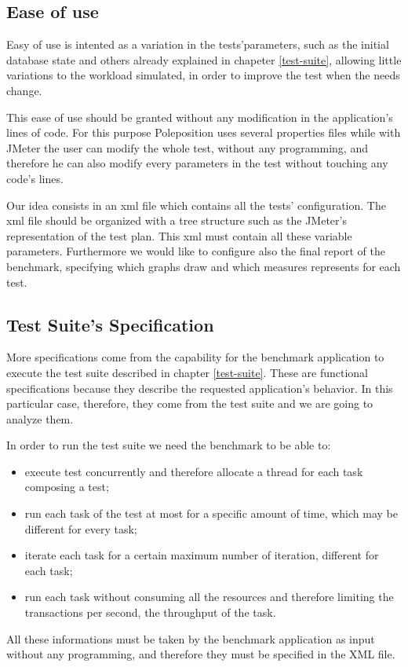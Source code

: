 		\subsection{Ease of use}
Easy of use is intented as a variation in the tests'parameters, such as the initial database state and others already explained in chapeter \ref{test-suite}, allowing little variations to the workload simulated, in order to improve the test when the needs change. 

This ease of use should be granted without any modification in the application's lines of code. For this purpose Poleposition uses several properties files while with JMeter the user can modify the whole test, without any programming, and therefore he can also modify every parameters in the test without touching any code's lines.

Our idea consists in an xml file which contains all the tests' configuration. The xml file should be organized with a tree structure such as the JMeter's representation of the test plan. This xml must contain all these variable parameters. Furthermore we would like to configure also the final report of the benchmark, specifying which graphs draw and which measures represents for each test.

		\subsection{Test Suite's Specification} \label{test-suite-specification}
More specifications come from the capability for the benchmark application to execute the test suite described in chapter \ref{test-suite}. These are functional specifications because they describe the requested application's behavior. In this particular case, therefore, they come from the test suite and we are going to analyze them. 

In order to run the test suite we need the benchmark to be able to:
\begin{itemize}
	\item execute test concurrently and therefore allocate a thread for each task composing a test; 
	\item run each task of the test at most for a specific amount of time, which may be different for every task;
	\item iterate each task for a certain maximum number of iteration, different for each task;
	\item run each task without consuming all the resources and therefore limiting the transactions per second, the throughput of the task.
\end{itemize}
All these informations must be taken by the benchmark application as input without any programming, and therefore they must be specified in the XML file.	
		
